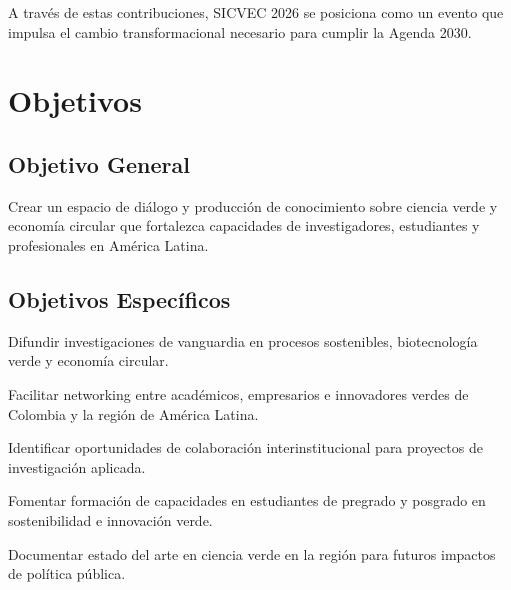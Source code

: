 \documentclass[12pt,a4paper]{article}
\begin{document}
A través de estas contribuciones, SICVEC 2026 se posiciona como un evento que impulsa el cambio transformacional necesario para cumplir la Agenda 2030.

\section{Objetivos}

\subsection{Objetivo General}

Crear un espacio de diálogo y producción de conocimiento sobre ciencia verde y economía circular que fortalezca capacidades de investigadores, estudiantes y profesionales en América Latina.

\subsection{Objetivos Específicos}

\begin{tcolorbox}[cajadef, title=OE1]
Difundir investigaciones de vanguardia en procesos sostenibles, biotecnología verde y economía circular.
\end{tcolorbox}

\begin{tcolorbox}[cajadef, title=OE2]
Facilitar networking entre académicos, empresarios e innovadores verdes de Colombia y la región de América Latina.
\end{tcolorbox}

\begin{tcolorbox}[cajadef, title=OE3]
Identificar oportunidades de colaboración interinstitucional para proyectos de investigación aplicada.
\end{tcolorbox}

\begin{tcolorbox}[cajadef, title=OE4]
Fomentar formación de capacidades en estudiantes de pregrado y posgrado en sostenibilidad e innovación verde.
\end{tcolorbox}

\begin{tcolorbox}[cajadef, title=OE5]
Documentar estado del arte en ciencia verde en la región para futuros impactos de política pública.
\end{tcolorbox}
\end{document}

